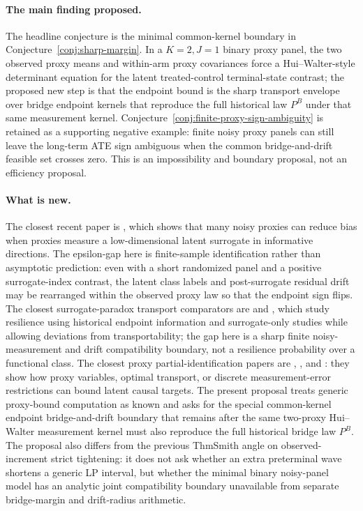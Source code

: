 \documentclass[11pt]{article}
\theoremstyle{definition}
\theoremstyle{plain}
\theoremstyle{remark}
\begin{document}
\paragraph{The main finding proposed.}
The headline conjecture is the minimal common-kernel boundary in Conjecture~\ref{conj:sharp-margin}.  In a \(K=2,J=1\) binary proxy panel, the two observed proxy means and within-arm proxy covariances force a Hui--Walter-style determinant equation for the latent treated-control terminal-state contrast; the proposed new step is that the endpoint bound is the sharp transport envelope over bridge endpoint kernels that reproduce the full historical law \(P^B\) under that same measurement kernel.  Conjecture~\ref{conj:finite-proxy-sign-ambiguity} is retained as a supporting negative example: finite noisy proxy panels can still leave the long-term ATE sign ambiguous when the common bridge-and-drift feasible set crosses zero.  This is an impossibility and boundary proposal, not an efficiency proposal.

\paragraph{What is new.}
The closest recent paper is \citet{LalImbensHull2026}, which shows that many noisy proxies can reduce bias when proxies measure a low-dimensional latent surrogate in informative directions.  The epsilon-gap here is finite-sample identification rather than asymptotic prediction: even with a short randomized panel and a positive surrogate-index contrast, the latent class labels and post-surrogate residual drift may be rearranged within the observed proxy law so that the endpoint sign flips.  The closest surrogate-paradox transport comparators are \citet{HsiaoTianParast2025} and \citet{HsiaoParast2026}, which study resilience using historical endpoint information and surrogate-only studies while allowing deviations from transportability; the gap here is a sharp finite noisy-measurement and drift compatibility boundary, not a resilience probability over a functional class.  The closest proxy partial-identification papers are \citet{GhassamiShpitserTchetgen2023}, \citet{Li2026}, and \citet{FinkelsteinAdamsSariaShpitser2021}: they show how proxy variables, optimal transport, or discrete measurement-error restrictions can bound latent causal targets.  The present proposal treats generic proxy-bound computation as known and asks for the special common-kernel endpoint bridge-and-drift boundary that remains after the same two-proxy Hui--Walter measurement kernel must also reproduce the full historical bridge law \(P^B\).  The proposal also differs from the previous ThmSmith angle on observed-increment strict tightening: it does not ask whether an extra preterminal wave shortens a generic LP interval, but whether the minimal binary noisy-panel model has an analytic joint compatibility boundary unavailable from separate bridge-margin and drift-radius arithmetic.
\end{document}
